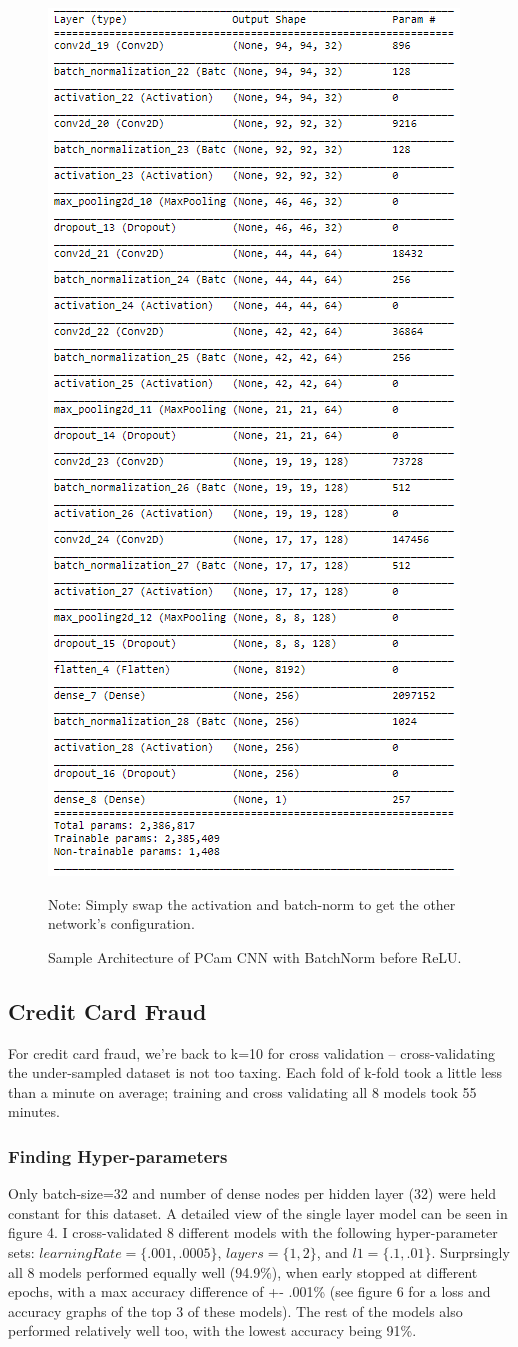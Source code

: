 \documentclass[a4paper]{article}
\begin{document}
\begin{figure}
  \centering
  \includegraphics[width=.6\textwidth]{images/arch.PNG}
  \caption{Sample Architecture of PCam CNN with BatchNorm before ReLU.}
  {Note: Simply swap the activation and batch-norm to get the other network's configuration.}
\end{figure}

\subsection{Credit Card Fraud}
For credit card fraud, we're back to k=10 for cross validation -- cross-validating the under-sampled dataset is not too taxing. Each fold of k-fold took a little less than a minute on average; training and cross validating all 8 models took 55 minutes.
\subsubsection{Finding Hyper-parameters}
Only batch-size=32 and number of dense nodes per hidden layer (32) were held constant for this dataset. A detailed view of the single layer model can be seen in figure 4. I cross-validated 8 different models with the following hyper-parameter sets: $learningRate = \{.001,  .0005\}$, $layers = \{1,  2\}$, and $l1 = \{.1,  .01\}$. Surprsingly all 8 models performed equally well (94.9\%), when early stopped at different epochs, with a max accuracy difference of +- .001\% (see figure 6 for a loss and accuracy graphs of the top 3 of these models). The rest of the models also performed relatively well too, with the lowest accuracy being 91\%. 
\end{document}
